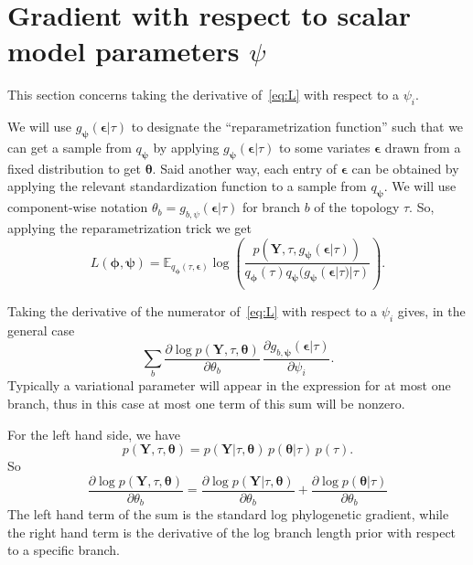 \documentclass{article}
\begin{document}
\section*{Gradient with respect to scalar model parameters $\psi$}

This section concerns taking the derivative of~\eqref{eq:L} with respect to a $\psi_i$.

We will use $g_{\bm{\psi}}(\bm{\epsilon}|\tau)$ to designate the ``reparametrization function'' such that we can get a sample from $q_{\bm\psi}$ by applying $g_{\bm{\psi}}(\bm{\epsilon}|\tau)$ to some variates $\bm\epsilon$ drawn from a fixed distribution to get $\bm\theta$.
Said another way, each entry of $\bm{\epsilon}$ can be obtained by applying the relevant standardization function to a sample from $q_{\bm\psi}$.
We will use component-wise notation $\theta_b = g_{b, \psi}(\bm\epsilon|\tau)$ for branch $b$ of the topology $\tau$.
So, applying the reparametrization trick we get
\begin{equation}
L(\bm{\phi},{\bm{\psi}}) = \mathbb{E}_{
    q_{\bm{\phi}}(\tau,\bm{\epsilon})}
    \log\left(
        \frac
        {p(\bm{Y},\tau,g_{\bm{\psi}}(\bm{\epsilon}|\tau))}
        {q_{\bm{\phi}}(\tau)q_{\bm{\psi}}(g_{\bm{\psi}}(\bm{\epsilon}|\tau)|\tau)}
    \right).
\label{eq:L}
\end{equation}

Taking the derivative of the numerator of~\eqref{eq:L} with respect to a $\psi_i$ gives, in the general case
\begin{equation}
    \sum_b
    \frac{\partial \log p(\bm{Y} , \tau, \bm\theta)}{\partial \theta_b} \,
    \frac{\partial g_{b,\bm\psi}(\bm\epsilon | \tau)}{\partial \psi_i}.
    \label{eq:dlogpdPsi}
\end{equation}
Typically a variational parameter will appear in the expression for at most one branch, thus in this case at most one term of this sum will be nonzero.

For the left hand side, we have
\[
p(\bm{Y},\tau,\bm\theta) =
p(\bm{Y}|\tau,\bm\theta) \, p(\bm\theta | \tau) \, p(\tau).
\]
So
\begin{equation*}
\frac{\partial \log p(\bm{Y}, \tau, \bm\theta)}{\partial \theta_b} =
\frac{\partial \log p(\bm{Y} | \tau, \bm\theta)}{\partial \theta_b}
+
\frac{\partial \log p(\bm\theta | \tau)}{\partial \theta_b}
\end{equation*}
The left hand term of the sum is the standard log phylogenetic gradient, while the right hand term is the derivative of the log branch length prior with respect to a specific branch.
\end{document}
